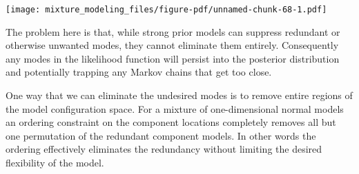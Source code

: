 \documentclass[
  letterpaper,
  DIV=11,
  numbers=noendperiod]{scrartcl}
\begin{document}
\texttt{[image: mixture\_modeling\_files/figure-pdf/unnamed-chunk-68-1.pdf]}

The problem here is that, while strong prior models can suppress
redundant or otherwise unwanted modes, they cannot eliminate them
entirely. Consequently any modes in the likelihood function will persist
into the posterior distribution and potentially trapping any Markov
chains that get too close.

One way that we can eliminate the undesired modes is to remove entire
regions of the model configuration space. For a mixture of
one-dimensional normal models an ordering constraint on the component
locations completely removes all but one permutation of the redundant
component models. In other words the ordering effectively eliminates the
redundancy without limiting the desired flexibility of the model.
\end{document}
